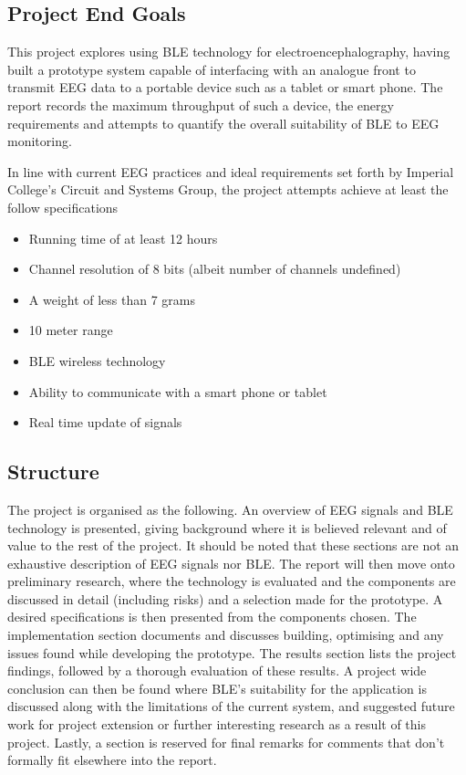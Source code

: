 \documentclass[]{article}
\begin{document}
\subsection{Project End Goals}

 This project explores using \ac{BLE} technology for electroencephalography, having built a prototype system capable of interfacing with an analogue front to transmit \ac{EEG} data to a portable device such as a tablet or smart phone.  The report records the maximum throughput of such a device, the energy requirements and attempts to quantify the overall suitability of \ac{BLE} to \ac{EEG} monitoring.

In line with current \ac{EEG} practices and ideal requirements set forth by Imperial College's Circuit and Systems Group, the project attempts achieve at least the follow specifications
\begin{itemize}
	\item Running time of at least 12 hours
	\item Channel resolution of 8 bits (albeit number of channels undefined)
	\item A weight of less than 7 grams
	\item 10 meter range
	\item BLE wireless technology
	\item Ability to communicate with a smart phone or tablet
	\item Real time update of signals
\end{itemize}

\subsection {Structure}
The project is organised as the following. An overview of \ac{EEG} signals and \ac{BLE} technology is presented, giving background where it is believed relevant and of value to the rest of the project. It should be noted that these sections are not an exhaustive description of \ac{EEG} signals nor \ac{BLE}. The report will then move onto preliminary research, where the technology is evaluated and the components are discussed in detail (including risks) and a selection made for the prototype. A desired specifications is then presented from the components chosen.  The implementation section documents and discusses building, optimising and any issues found while developing the prototype. The results section lists the project findings, followed by a thorough evaluation of these results. A project wide conclusion can then be found where \ac{BLE}'s suitability for the application is discussed along with the limitations of the current system, and suggested future work for project extension or further interesting research as a result of this project. Lastly, a section is reserved for final remarks for comments that don't formally fit elsewhere into the report.
\end{document}
